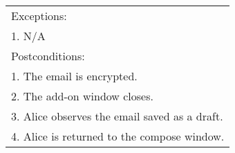 \begin{longtable} {|p{3cm}|p{9cm}|}
	\hline
	\hline
	\multicolumn{2}{|l|}{Exceptions:} \\
	\multicolumn{2}{|l|}{1. N/A} \\
	\hline
	\hline
	\multicolumn{2}{|l|}{Postconditions:} \\
	\multicolumn{2}{|l|}{1. The email is encrypted.} \\
	\multicolumn{2}{|l|}{2. The add-on window closes.} \\
	\multicolumn{2}{|l|}{3. Alice observes the email saved as a draft.} \\
	\multicolumn{2}{|l|}{4. Alice is returned to the compose window.} \\
	\hline
\end{longtable}

